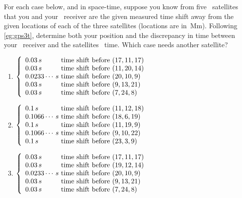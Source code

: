 \begin{comment}
Possibly polynomial\slash multivariate curve fitting (exact)  \larsvii{p.25--8} as example of data mining, and scientific and engineering inference? e.g.~discovering `index' combinations.
Applications involving homogeneous systems, such as balance chemical reactions, leave for the next section.
Nakos~\S1.4 has lots of good ideas (including derivation of cosine rule for triangles).
\end{comment}





\begin{exercise} \label{ex:gps3t} 
For each case below, and in space-time, suppose you know from five \gps\ satellites that you and your \gps\ receiver are the given measured time shift away from the given locations of each of the three satellites (locations are in~Mm).  
Following \autoref{eg:gps3t}, determine both your position and the discrepancy in time between your \gps\ receiver and the satellites \gps\ time.  
Which case needs another satellite?
\begin{enumerate}
\item  
\(\left\{\begin{array}{l@{\text{ time shift before }}l}
0.03\,s&(17,11,17)\\
0.03\,s&(11,20,14)\\
0.0233\cdots\,s&(20,10,9)\\
0.03\,s&(9,13,21)\\
0.03\,s&(7,24,8)
\end{array}\right.\)

\item 
\(\left\{\begin{array}{l@{\text{ time shift before }}l}
0.1\,s&(11,12,18)\\
0.1066\cdots\,s&(18,6,19)\\
0.1\,s&(11,19,9)\\
0.1066\cdots\,s&(9,10,22)\\
0.1\,s&(23,3,9)
\end{array}\right.\)

\item 
\(\left\{\begin{array}{l@{\text{ time shift before }}l}
0.03\,s&(17,11,17)\\
0.03\,s&(19,12,14)\\
0.0233\cdots\,s&(20,10,9)\\
0.03\,s&(9,13,21)\\
0.03\,s&(7,24,8)
\end{array}\right.\)

\end{enumerate}
\end{exercise}






